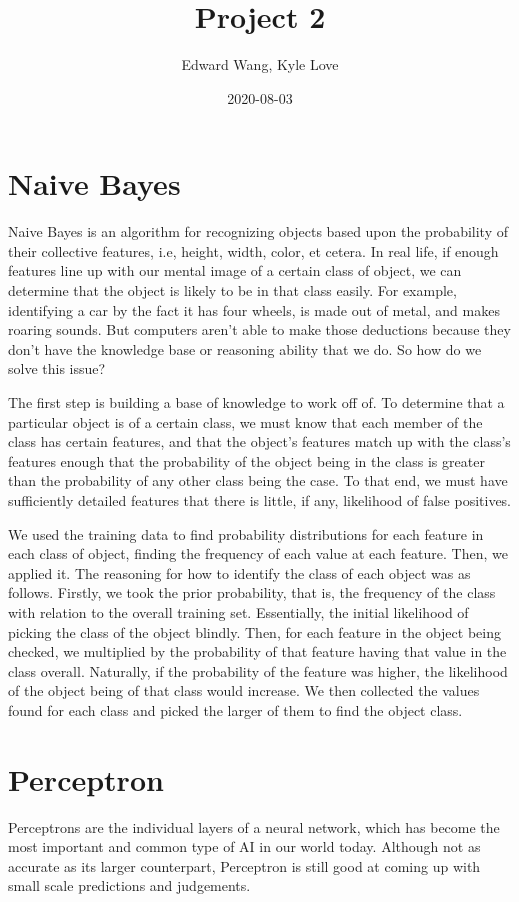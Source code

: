 \documentclass{article}
\title{Project 2}
\date{2020-08-03}
\author{Edward Wang, Kyle Love}
\begin{document}
\maketitle

\section{Naive Bayes}
Naive Bayes is an algorithm for recognizing objects based upon the probability of their collective features, i.e, height, width, color, et cetera. In real life, if enough features line up with our mental image of a certain class of object, we can determine that the object is likely to be in that class easily. For example, identifying a car by the fact it has four wheels, is made out of metal, and makes roaring sounds. But computers aren't able to make those deductions because they don't have the knowledge base or reasoning ability that we do. So how do we solve this issue?
\par
The first step is building a base of knowledge to work off of. To determine that a particular object is of a certain class, we must know that each member of the class has certain features, and that the object's features match up with the class's features enough that the probability of the object being in the class is greater than the probability of any other class being the case. To that end, we must have sufficiently detailed features that there is little, if any, likelihood of false positives.
\par
We used the training data to find probability distributions for each feature in each class of object, finding the frequency of each value at each feature. Then, we applied it. The reasoning for how to identify the class of each object was as follows. Firstly, we took the prior probability, that is, the frequency of the class with relation to the overall training set. Essentially, the initial likelihood of picking the class of the object blindly. Then, for each feature in the object being checked, we multiplied by the probability of that feature having that value in the class overall. Naturally, if the probability of the feature was higher, the likelihood of the object being of that class would increase. We then collected the values found for each class and picked the larger of them to find the object class.
\section{Perceptron}
Perceptrons are the individual layers of a neural network, which has become the most important and common type of AI in our world today. Although not as accurate as its larger counterpart, Perceptron is still good at coming up with small scale predictions and judgements.
\end{document}
